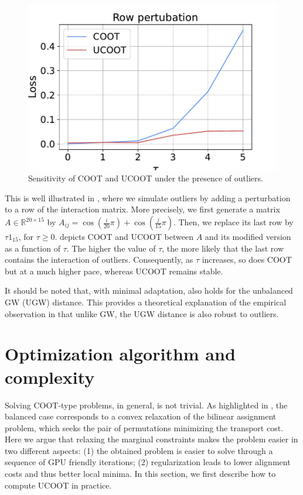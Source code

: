\setlength{\columnsep}{10pt}%
\setlength{\intextsep}{0pt}
\begin{figure}
  \centering
  \vspace{-10pt}
  \includegraphics[width=\linewidth]{./Chapitre3/fig/robustness_2.pdf}
  \caption{Sensitivity of COOT and UCOOT under the presence of outliers.
  \label{fig:robust}}
\end{figure}
This is well illustrated in ,
where we simulate outliers by adding a perturbation to a row of the interaction matrix.
More precisely, we first generate a matrix $A \in \mathbb R^{20 \times 15}$ by
$A_{ij} = \cos(\frac{i}{20} \pi) + \cos(\frac{j}{15} \pi)$.
Then, we replace its last row by $\tau 1_{15}$, for $\tau \geq 0$.
 depicts COOT and UCOOT between $A$
and its modified version as a function of $\tau$. The higher the value of $\tau$,
the more likely that the last row contains the interaction of outliers.
Consequently, as $\tau$ increases, so does COOT but at a much higher pace,
whereas UCOOT remains stable.

It should be noted that, with minimal adaptation, 
also holds for the unbalanced GW (UGW) distance.
This provides a theoretical explanation of the empirical observation in \citep{Sejourne20}
that unlike GW, the UGW distance is also robust to outliers.

\section{Optimization algorithm and complexity} \label{subsec_app:algo}
Solving COOT-type problems, in general, is not trivial. As highlighted in \citep{Redko20},
the balanced case corresponds to a convex relaxation of the bilinear assignment problem,
which seeks the pair of permutations minimizing the transport cost.
Here we argue that relaxing the marginal constraints makes the problem easier
in two different aspects: (1) the obtained problem is easier to solve
through a sequence of GPU friendly iterations; (2) regularization leads to lower alignment costs
and thus better local minima. In this section, we first describe how to compute UCOOT in practice.

